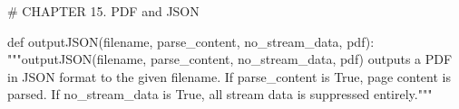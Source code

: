# CHAPTER 15. PDF and JSON

def outputJSON(filename, parse_content, no_stream_data, pdf):
    """outputJSON(filename, parse_content, no_stream_data, pdf) outputs a PDF
    in JSON format to the given filename. If parse_content is True, page
    content is parsed. If no_stream_data is True, all stream data is suppressed
    entirely."""
